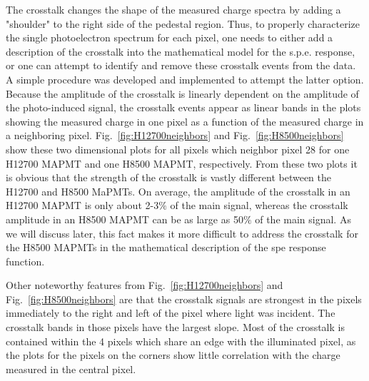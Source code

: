 The crosstalk changes the shape of the measured charge spectra by adding a "shoulder" to the right side of the pedestal region. Thus, to properly characterize the single photoelectron spectrum for each pixel, one needs to either add a description of the crosstalk into the mathematical model for the s.p.e. response, or one can attempt to identify and remove these crosstalk events from the data. A simple procedure was developed and implemented to attempt the latter option. Because the amplitude of the crosstalk is linearly dependent on the amplitude of the photo-induced signal, the crosstalk events appear as linear bands in the plots showing the measured charge in one pixel as a function of the measured charge in a neighboring pixel. Fig.~\ref{fig:H12700neighbors} and Fig.~\ref{fig:H8500neighbors} show these two dimensional plots for all pixels which neighbor pixel 28 for one H12700 MAPMT and one H8500 MAPMT, respectively. From these two plots it is obvious that the strength of the crosstalk is vastly different between the H12700 and H8500 MaPMTs. On average, the amplitude of the crosstalk in an H12700 MAPMT is only about 2-3$\%$ of the main signal, whereas the crosstalk amplitude in an H8500 MAPMT can be as large as 50$\%$ of the main signal. As we will discuss later, this fact makes it more difficult to address the crosstalk for the H8500 MAPMTs in the mathematical description of the spe response function.

Other noteworthy features from Fig.~\ref{fig:H12700neighbors} and Fig.~\ref{fig:H8500neighbors} are that the crosstalk signals are strongest in the pixels immediately to the right and left of the pixel where light was incident. The crosstalk bands in those pixels have the largest slope. Most of the crosstalk is contained within the 4 pixels which share an edge with the illuminated pixel, as the plots for the pixels on the corners show little correlation with the charge measured in the central pixel.

